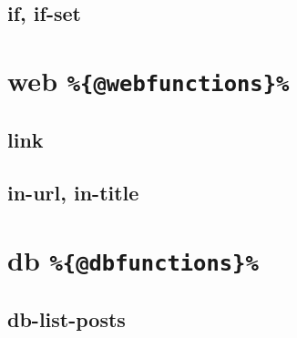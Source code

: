 \documentclass{memoir}
\newcommand{\var}[1]{\texttt{\%\{#1\}\%}}
\begin{document}
		\subsection{if, if-set} %




	\section{web \var{@webfunctions}} %

		\subsection{link}
		\subsection{in-url, in-title}


	\section{db \var{@dbfunctions}} %

		\subsection{db-list-posts}




\printglossary
\end{document}

